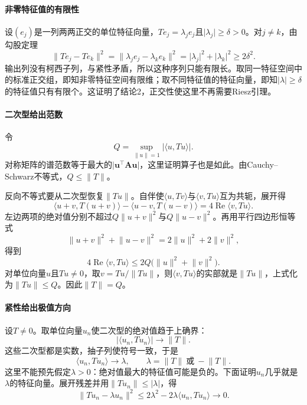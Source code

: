 \paragraph{非零特征值的有限性}
设$(e_j)$是一列两两正交的单位特征向量，$Te_j=\lambda_je_j$且$\lvert\lambda_j\rvert\geq\delta>0$。对$j\neq k$，由勾股定理
\[
\lVert Te_j-Te_k\rVert^2=\lVert\lambda_je_j-\lambda_ke_k\rVert^2=\lvert\lambda_j\rvert^2+\lvert\lambda_k\rvert^2\geq2\delta^2 .
\]
输出列没有柯西子列，与紧性矛盾，所以这种序列只能有限长。取同一特征空间中的标准正交组，即知非零特征空间有限维；取不同特征值的特征向量，即知$\lvert\lambda\rvert\geq\delta$的特征值只有有限个。这证明了结论2，正交性使这里不再需要Riesz引理。

\paragraph{二次型给出范数}
令
\[
Q=\sup_{\lVert u\rVert=1}\lvert\langle u,Tu\rangle\rvert .
\]
对称矩阵的谱范数等于最大的$\lvert\bm u^\top\bm A\bm u\rvert$，这里证明算子也是如此。由Cauchy--Schwarz不等式，$Q\leq\lVert T\rVert$。

反向不等式要从二次型恢复$\lVert Tu\rVert$。自伴使$\langle u,Tv\rangle$与$\langle v,Tu\rangle$互为共轭，展开得
\[
\langle u+v,T(u+v)\rangle-\langle u-v,T(u-v)\rangle=4\operatorname{Re}\langle v,Tu\rangle .
\]
左边两项的绝对值分别不超过$Q\lVert u+v\rVert^2$与$Q\lVert u-v\rVert^2$。再用平行四边形恒等式
\[
\lVert u+v\rVert^2+\lVert u-v\rVert^2=2\lVert u\rVert^2+2\lVert v\rVert^2,
\]
得到
\[
4\operatorname{Re}\langle v,Tu\rangle\leq2Q\bigl(\lVert u\rVert^2+\lVert v\rVert^2\bigr).
\]
对单位向量$u$且$Tu\neq0$，取$v=Tu/\lVert Tu\rVert$，则$\langle v,Tu\rangle$的实部就是$\lVert Tu\rVert$，上式化为$\lVert Tu\rVert\leq Q$。因此$\lVert T\rVert=Q$。

\paragraph{紧性给出极值方向}
设$T\neq0$。取单位向量$u_n$使二次型的绝对值趋于上确界：
\[
\lvert\langle u_n,Tu_n\rangle\rvert\to\lVert T\rVert .
\]
这些二次型都是实数，抽子列使符号一致，于是
\[
\langle u_n,Tu_n\rangle\to\lambda,\qquad\lambda=\lVert T\rVert\ \text{或}\ -\lVert T\rVert .
\]
这里不能预先假定$\lambda>0$：绝对值最大的特征值可能是负的。下面证明$u_n$几乎就是$\lambda$的特征向量。展开残差并用$\lVert Tu_n\rVert\leq\lvert\lambda\rvert$，得
\begin{equation}
\lVert Tu_n-\lambda u_n\rVert^2\leq2\lambda^2-2\lambda\langle u_n,Tu_n\rangle\to0 .
\label{eq:ospec-rayleigh-residual}
\end{equation}

